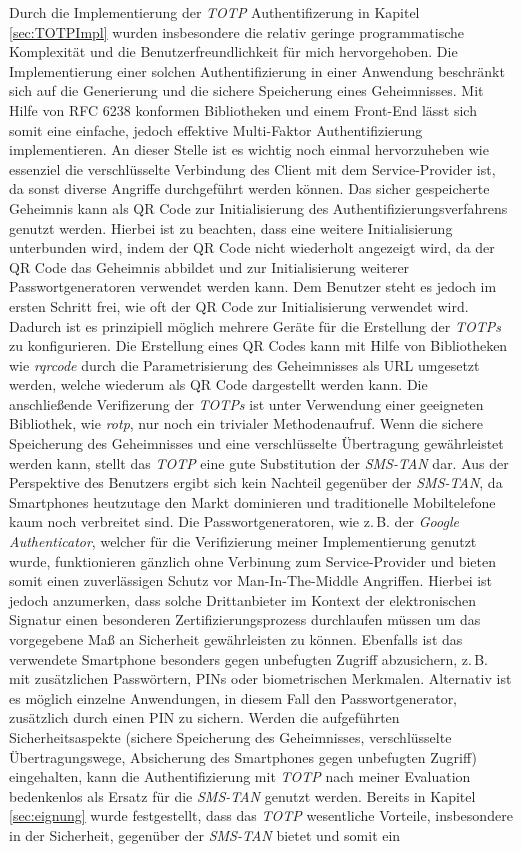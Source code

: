\documentclass[11pt,a4paper,ngerman]{scrreprt}
\begin{document}
Durch die Implementierung der \textit{TOTP} Authentifizerung in Kapitel \ref{sec:TOTPImpl} wurden insbesondere die relativ geringe programmatische Komplexität und die Benutzerfreundlichkeit für mich hervorgehoben. Die Implementierung einer solchen Authentifizierung in einer Anwendung beschränkt sich auf die Generierung und die sichere Speicherung eines Geheimnisses. Mit Hilfe von RFC 6238 konformen Bibliotheken und einem Front-End lässt sich somit eine einfache, jedoch effektive Multi-Faktor Authentifizierung implementieren. An dieser Stelle ist es wichtig noch einmal hervorzuheben wie essenziel die verschlüsselte Verbindung des Client mit dem Service-Provider ist, da sonst diverse Angriffe durchgeführt werden können. Das sicher gespeicherte Geheimnis kann als QR Code zur Initialisierung des Authentifizierungsverfahrens genutzt werden. Hierbei ist zu beachten, dass eine weitere Initialisierung unterbunden wird, indem der QR Code nicht wiederholt angezeigt wird, da der QR Code das Geheimnis abbildet und zur Initialisierung weiterer Passwortgeneratoren verwendet werden kann. Dem Benutzer steht es jedoch im ersten Schritt frei, wie oft der QR Code zur Initialisierung verwendet wird. Dadurch ist es prinzipiell möglich mehrere Geräte für die Erstellung der \textit{TOTPs} zu konfigurieren. Die Erstellung eines QR Codes kann mit Hilfe von Bibliotheken wie \textit{rqrcode} durch die Parametrisierung des Geheimnisses als URL umgesetzt werden, welche wiederum als QR Code dargestellt werden kann. Die anschließende Verifizerung der \textit{TOTPs} ist unter Verwendung einer geeigneten Bibliothek, wie \textit{rotp}, nur noch ein trivialer Methodenaufruf. Wenn die sichere Speicherung des Geheimnisses und eine verschlüsselte Übertragung gewährleistet werden kann, stellt das \textit{TOTP} eine gute Substitution der \textit{SMS-TAN} dar. Aus der Perspektive des Benutzers ergibt sich kein Nachteil gegenüber der \textit{SMS-TAN}, da Smartphones heutzutage den Markt dominieren und traditionelle Mobiltelefone kaum noch verbreitet sind. Die Passwortgeneratoren, wie z.\,B. der \textit{Google Authenticator}, welcher für die Verifizierung meiner Implementierung genutzt wurde, funktionieren gänzlich ohne Verbinung zum Service-Provider und bieten somit einen zuverlässigen Schutz vor Man-In-The-Middle Angriffen. Hierbei ist jedoch anzumerken, dass solche Drittanbieter im Kontext der elektronischen Signatur einen besonderen Zertifizierungsprozess durchlaufen müssen um das vorgegebene Maß an Sicherheit gewährleisten zu können. Ebenfalls ist das verwendete Smartphone besonders gegen unbefugten Zugriff abzusichern, z.\,B. mit zusätzlichen Passwörtern, PINs oder biometrischen Merkmalen. Alternativ ist es möglich einzelne Anwendungen, in diesem Fall den Passwortgenerator, zusätzlich durch einen PIN zu sichern. Werden die aufgeführten Sicherheitsaspekte (sichere Speicherung des Geheimnisses, verschlüsselte Übertragungswege, Absicherung des Smartphones gegen unbefugten Zugriff) eingehalten, kann die Authentifizierung mit \textit{TOTP} nach meiner Evaluation bedenkenlos als Ersatz für die \textit{SMS-TAN} genutzt werden. Bereits in Kapitel \ref{sec:eignung} wurde festgestellt, dass das \textit{TOTP} wesentliche Vorteile, insbesondere in der Sicherheit, gegenüber der \textit{SMS-TAN} bietet und somit ein 
\end{document}
